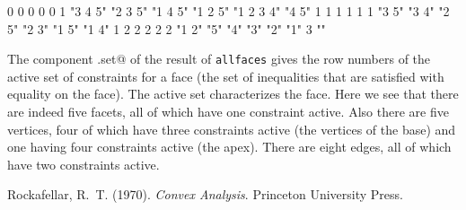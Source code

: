\documentclass{article}
\begin{document}
\begin{Schunk}
\begin{Soutput}
        0         0         0         0         0         1 
  "3 4 5"   "2 3 5"   "1 4 5"   "1 2 5" "1 2 3 4"     "4 5" 
        1         1         1         1         1         1 
    "3 5"     "3 4"     "2 5"     "2 3"     "1 5"     "1 4" 
        1         2         2         2         2         2 
    "1 2"       "5"       "4"       "3"       "2"       "1" 
        3 
       "" 
\end{Soutput}
\end{Schunk}
The component \verb@active.set@ of the result of \texttt{allfaces}
gives the row numbers of the active set of constraints for a face
(the set of inequalities that are satisfied with equality on the face).
The active set characterizes the face.  Here we see that there are indeed
five facets, all of which have one constraint active.
Also there are five vertices, four of which have three constraints active
(the vertices of the base) and one having four constraints active (the apex).
There are eight edges, all of which have two constraints active.

\begin{thebibliography}{}

Rockafellar, R.~T. (1970).
\newblock \emph{Convex Analysis}.
\newblock Princeton University Press.

\end{thebibliography}
\end{document}
